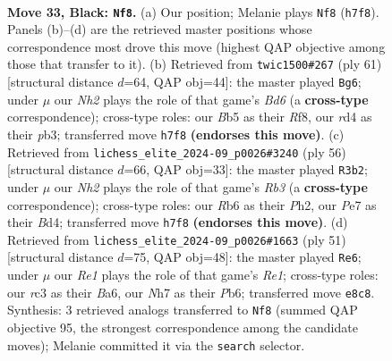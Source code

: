 \documentclass[11pt]{article}
\begin{document}
\clearpage

\begin{figure}[p]\centering
\begin{subfigure}{0.46\textwidth}\centering
\resizebox{\linewidth}{!}{%
\newchessgame
\chessboard[
  setfen={4r3/kp2p2n/1r1p2Q1/1b4p1/3RP3/1PR2P2/6PP/1K6 b - - 0 33},
  showmover=false,
  pgfstyle=straightmove, color=movearrow, markmove={h7-f8}
]}
\caption{}
\end{subfigure}\hfill
\begin{subfigure}{0.46\textwidth}\centering
\resizebox{\linewidth}{!}{%
\newchessgame
\chessboard[
  setfen={5r1k/5p1p/pp2rp2/8/P2Q4/1P1b3P/5PP1/2R3K1 b - - 4 31},
  showmover=false,
  pgfstyle=straightmove, color=movearrow, markmove={d3-g6}
]}
\caption{}
\end{subfigure}
\\[4pt]
\begin{subfigure}{0.46\textwidth}\centering
\resizebox{\linewidth}{!}{%
\newchessgame
\chessboard[
  setfen={6k1/1r4pp/pP6/3p4/3B4/1R6/2q2PPP/1R4K1 w - - 0 29},
  showmover=false,
  pgfstyle=straightmove, color=movearrow, markmove={b3-b2}
]}
\caption{}
\end{subfigure}\hfill
\begin{subfigure}{0.46\textwidth}\centering
\resizebox{\linewidth}{!}{%
\newchessgame
\chessboard[
  setfen={4rr2/3Q1pkp/bp6/p1p4p/P7/1P1P1R2/1P4PP/6K1 b - - 2 26},
  showmover=false,
  pgfstyle=straightmove, color=movearrow, markmove={e8-e6}
]}
\caption{}
\end{subfigure}
\caption{\textbf{Move 33, Black: \texttt{Nf8}.} (a) Our position; Melanie plays \texttt{Nf8} (\texttt{h7f8}). Panels (b)--(d) are the retrieved master positions whose correspondence most drove this move (highest QAP objective among those that transfer to it). (b) Retrieved from \texttt{twic1500\#267} (ply 61) [structural distance $d$=64, QAP obj=44]: the master played \texttt{Bg6}; under $\mu$ our \emph{Nh2} plays the role of that game's \emph{Bd6} (a \textbf{cross-type} correspondence); cross-type roles: our \emph{B}b5 as their \emph{R}f8, our \emph{r}d4 as their \emph{p}b3; transferred move \texttt{h7f8} \textbf{(endorses this move)}. (c) Retrieved from \texttt{lichess\_elite\_2024-09\_p0026\#3240} (ply 56) [structural distance $d$=66, QAP obj=33]: the master played \texttt{R3b2}; under $\mu$ our \emph{Nh2} plays the role of that game's \emph{Rb3} (a \textbf{cross-type} correspondence); cross-type roles: our \emph{R}b6 as their \emph{P}h2, our \emph{P}e7 as their \emph{B}d4; transferred move \texttt{h7f8} \textbf{(endorses this move)}. (d) Retrieved from \texttt{lichess\_elite\_2024-09\_p0026\#1663} (ply 51) [structural distance $d$=75, QAP obj=48]: the master played \texttt{Re6}; under $\mu$ our \emph{Re1} plays the role of that game's \emph{Re1}; cross-type roles: our \emph{r}c3 as their \emph{B}a6, our \emph{N}h7 as their \emph{P}b6; transferred move \texttt{e8c8}. Synthesis: 3 retrieved analogs transferred to \texttt{Nf8} (summed QAP objective 95, the strongest correspondence among the candidate moves); Melanie committed it via the \texttt{search} selector.}
\label{fig:thought-m65}
\end{figure}
\end{document}
